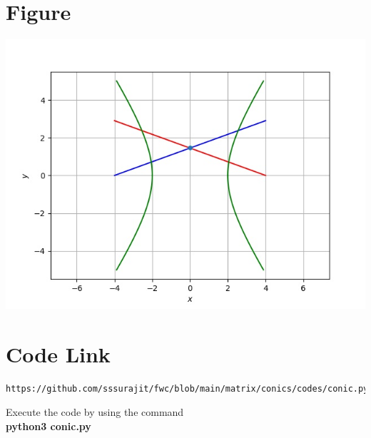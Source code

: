 \documentclass[journal,12pt,twocolumn]{IEEEtran}
\begin{document}
\section{\textbf{Figure}}

    \centering
    \includegraphics[width=\columnwidth]{fig.jpg}
    \label{fig:my_label}
    
\section{\textbf{Code Link}}

\begin{lstlisting}
https://github.com/sssurajit/fwc/blob/main/matrix/conics/codes/conic.py
\end{lstlisting}
Execute the code by using the command
\\ \textbf{python3 conic.py}
\end{document}
